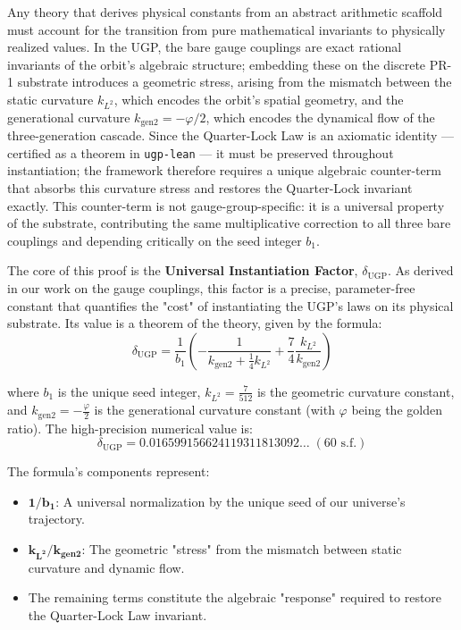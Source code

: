 \documentclass[11pt,twocolumn]{article}
\theoremstyle{remark}
\begin{document}
Any theory that derives physical constants from an abstract arithmetic scaffold must account for the transition from pure mathematical invariants to physically realized values. In the UGP, the bare gauge couplings are exact rational invariants of the orbit's algebraic structure; embedding these on the discrete PR-1 substrate introduces a geometric stress, arising from the mismatch between the static curvature $k_{L^2}$, which encodes the orbit's spatial geometry, and the generational curvature $k_{\text{gen2}} = -\varphi/2$, which encodes the dynamical flow of the three-generation cascade. Since the Quarter-Lock Law is an axiomatic identity --- certified as a theorem in \texttt{ugp-lean} --- it must be preserved throughout instantiation; the framework therefore requires a unique algebraic counter-term that absorbs this curvature stress and restores the Quarter-Lock invariant exactly. This counter-term is not gauge-group-specific: it is a universal property of the substrate, contributing the same multiplicative correction to all three bare couplings and depending critically on the seed integer $b_1$.

The core of this proof is the \textbf{Universal Instantiation Factor}, $\delta_{\text{UGP}}$. As derived in our work on the gauge couplings, this factor is a precise, parameter-free constant that quantifies the "cost" of instantiating the UGP's laws on its physical substrate. Its value is a theorem of the theory, given by the formula:
\begin{equation}
    \delta_{\text{UGP}} = \frac{1}{b_1} \left( -\frac{1}{k_{\text{gen2}} + \frac{1}{4}k_{L^2}} + \frac{7}{4}\frac{k_{L^2}}{k_{\text{gen2}}} \right)
    \label{eq:delta_ugp}
\end{equation}

where $b_1$ is the unique seed integer, $k_{L^2} = \frac{7}{512}$ is the geometric curvature constant, and $k_{\text{gen2}} = -\frac{\varphi}{2}$ is the generational curvature constant (with $\varphi$ being the golden ratio). The high-precision numerical value is:
\begin{equation*}
\delta_{\text{UGP}} = 0.016599156624119311813092\ldots\;(60\text{ s.f.})
\end{equation*}

The formula's components represent:
\begin{itemize}[leftmargin=1.2em,itemsep=0.2em]
    \item $\mathbf{1/b_1}$: A universal normalization by the unique seed of our universe's trajectory.
    \item $\mathbf{k_{L^2}/k_{\text{gen2}}}$: The geometric "stress" from the mismatch between static curvature and dynamic flow.
    \item The remaining terms constitute the algebraic "response" required to restore the Quarter-Lock Law invariant.
\end{itemize}
\end{document}
